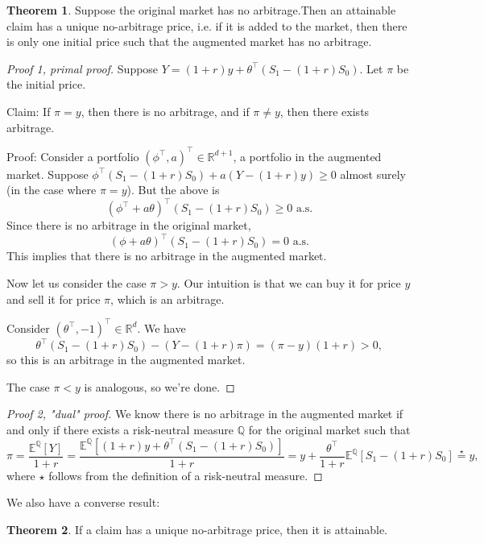 \documentclass{article}
\theoremstyle{definition}
\newtheorem{theorem}{Theorem}[section]
\begin{document}
\begin{theorem}
    Suppose the original market has no arbitrage.Then an attainable claim has a unique no-arbitrage price, i.e. if it is added to the market, then there is only one initial price such that the augmented market has no arbitrage.
\end{theorem}
\begin{proof}[Proof 1, primal proof]
    Suppose $Y = (1+r)y + \theta^\top(S_1-(1+r)S_0)$. Let $\pi$ be the initial price.
    \vspace{1mm}
    
    Claim: If $\pi=y$, then there is no arbitrage, and if $\pi \neq y$, then there exists arbitrage.

    Proof: Consider a portfolio $(\phi^\top, a)^\top \in \mathbb{R}^{d+1}$, a portfolio in the augmented market. Suppose $\phi^\top(S_1-(1+r)S_0) + a(Y-(1+r)y) \ge 0$ almost surely (in the case where $\pi = y$). But the above is \[
    (\phi^\top + a \theta)^\top(S_1-(1+r)S_0)\ge 0 \text{ a.s.}
    \]
    Since there is no arbitrage in the original market, $$(\phi+a \theta)^\top(S_1-(1+r)S_0)=0 \text{ a.s.}$$
    This implies that there is no arbitrage in the augmented market.
    \vspace{1mm}
    
    Now let us consider the case $\pi > y$. Our intuition is that we can buy it for price $y$ and sell it for price $\pi$, which is an arbitrage. 

    Consider $(\theta^\top,-1)^\top \in \mathbb{R}^d$. We have \[
    \theta^\top(S_1-(1+r)S_0)-(Y-(1+r)\pi) = (\pi-y)(1+r)>0,    
    \]
    so this is an arbitrage in the augmented market.

    The case $\pi < y$ is analogous, so we're done.
\end{proof}
\begin{proof}[Proof 2, "dual" proof]
    We know there is no arbitrage in the augmented market if and only if there exists a risk-neutral measure $\mathbb{Q}$ for the original market such that $$\pi = \frac{\mathbb{E}^{\mathbb{Q}}[Y]}{1+r} = \frac{\mathbb{E}^\mathbb{Q}[(1+r)y + \theta^\top(S_1-(1+r)S_0)]}{1+r} = y + \frac{\theta^\top}{1+r}\mathbb{E}^{\mathbb{Q}}[S_1-(1+r)S_0] \stackrel{\star}{=} y,$$
    where $\star$ follows from the definition of a risk-neutral measure.
\end{proof}
We also have a converse result:
\begin{theorem}
    If a claim has a unique no-arbitrage price, then it is attainable.    
\end{theorem}
\end{document}

